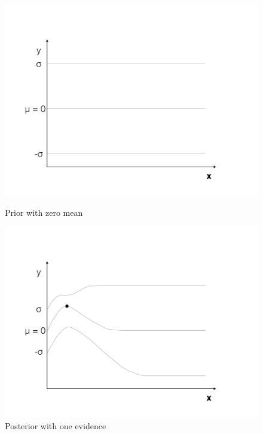 \documentclass[english]{tktltiki}
\begin{document}
\begin{figure}[h!]
\centering
\begin{minipage}{.5\linewidth}
  \centering
  \includegraphics[width=\linewidth]{figures/GP_1.png}
  \caption{Prior with zero mean}
  \label{fig:sub1}
\end{minipage}%
\begin{minipage}{.5\linewidth}
  \centering
  \includegraphics[width=\linewidth]{figures/GP_2.png}
  \caption{Posterior with one evidence}
  \label{fig:sub2}
\end{minipage}


\end{figure}
\end{document}
